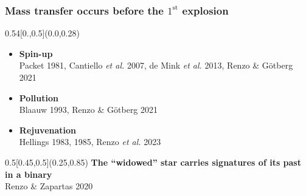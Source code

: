 \documentclass[xcolor=dvipsnames,professionalfonts, aspectratio=169]{beamer}
\begin{document}
\bgroup
{}
\begin{frame}[plain]


  \frametitle{\textcolor{white!80!Yellow}{Mass
      transfer occurs before the  $1^\mathrm{st}$ explosion}}
  \begin{textblock}{0.54}[0.,0.5](0.0,0.28)
    \centering
    \begin{itemize}
    \item<2->[\textcolor{white!80!Yellow}{\textbullet}]
      \textcolor{white!80!Yellow}{\bf Spin-up}\\[-4pt]
      \textcolor{gray!50}{\tiny Packet 1981, Cantiello \emph{et al.}
        2007, de Mink \emph{et al.} 2013, Renzo \& G\"otberg 2021}\\[3pt]
    \item<3->[\textcolor{white!80!Yellow}{\textbullet}]
      \textcolor{white!80!Yellow}{\bf Pollution}\\[-4pt]
      \textcolor{gray!50}{\tiny Blaauw 1993, Renzo \& G\"otberg 2021}\\[3pt]
    \item<4>[\textcolor{white!80!Yellow}{\textbullet}]
      \textcolor{white!80!Yellow}{\bf Rejuvenation}\\[-4pt]
      \textcolor{gray!50}{\tiny Hellings 1983, 1985, Renzo \emph{et al.} 2023}
    \end{itemize}
  \end{textblock}
  \begin{textblock}{0.5}[0.45,0.5](0.25,0.85)
    \centering
    \textcolor{whiteish}{
      \bf The ``widowed'' star carries signatures of its past in a binary}\\[-2pt]
    \hfill\textcolor{gray!50}{\tiny Renzo \& Zapartas 2020}\ \,
  \end{textblock}
\end{frame}
\egroup
\end{document}
